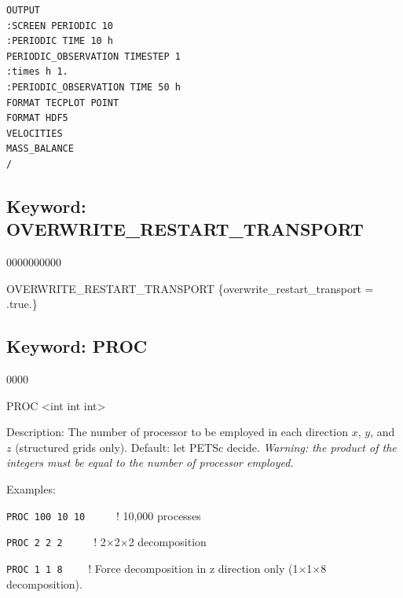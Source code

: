 \documentclass[12pt]{article}
\begin{document}

\begin{verbatim}
OUTPUT
:SCREEN PERIODIC 10
:PERIODIC TIME 10 h
PERIODIC_OBSERVATION TIMESTEP 1
:times h 1.
:PERIODIC_OBSERVATION TIME 50 h
FORMAT TECPLOT POINT
FORMAT HDF5
VELOCITIES
MASS_BALANCE
/
\end{verbatim}


\newpage
\protect\hypertarget{target_overwrite}{}

\subsection{Keyword: OVERWRITE\_RESTART\_TRANSPORT}
\begin{deflist}{0000000000}
\item[OVERWRITE\_RESTART\_TRANSPORT] \{overwrite\_restart\_transport = .true.\}
\end{deflist}


\newpage
\protect\hypertarget{target_proc}{}

\subsection{Keyword: PROC}

\begin{deflist}{0000}
\item[PROC] <int int int> 
\item[Description:] The number of processor to be employed in each direction $x$, $y$, and $z$ (structured grids only). Default: let PETSc decide. {\em Warning: the product of the integers must be equal to the number of processor employed.}
\item[Examples:] ~

{\tt PROC 100 10 10} \ \ \ \ \ ! 10,000 processes

{\tt PROC 2 2 2} \ \ \ \ \ ! 2$\times$2$\times$2 decomposition

{\tt PROC 1 1 8} \ \ \ \ ! Force decomposition in z direction only (1$\times$1$\times$8 decomposition).
\end{deflist}

\end{document}

